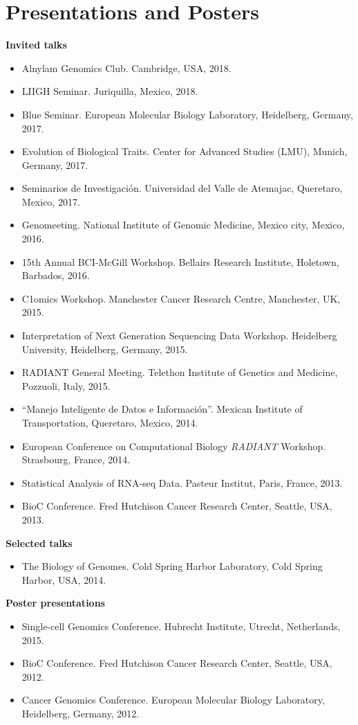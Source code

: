 \documentclass[11pt,a4paper,sans]{moderncv} %
\begin{document}
\section{Presentations and Posters}
\vspace{-.1cm}
\textbf{Invited talks}
\begin{itemize}
\item Alnylam Genomics Club. Cambridge, USA, 2018.
\item LIIGH Seminar. Juriquilla, Mexico, 2018.
\item Blue Seminar. European Molecular Biology Laboratory, Heidelberg, Germany, 2017. 
\item Evolution of Biological Traits. Center for Advanced Studies (LMU), Munich, Germany, 2017.
\item Seminarios de Investigaci\'on. Universidad del Valle de Atemajac, Queretaro, Mexico, 2017.
\item Genomeeting. National Institute of Genomic Medicine, Mexico city, Mexico, 2016. 
\item 15th Annual BCI-McGill Workshop. Bellairs Research Institute, Holetown, Barbados, 2016.
\item C1omics Workshop. Manchester Cancer Research Centre, Manchester, UK, 2015.
\item Interpretation of Next Generation Sequencing Data Workshop. Heidelberg University, Heidelberg, Germany, 2015. 
\item RADIANT General Meeting. Telethon Institute of Genetics and Medicine, Pozzuoli, Italy, 2015.
\item ``Manejo Inteligente de Datos e Informaci\'on''. Mexican Institute of Transportation, Queretaro, Mexico, 2014.
\item European Conference on Computational Biology \emph{RADIANT} Workshop. Strasbourg, France, 2014.
\item Statistical Analysis of RNA-seq Data. Pasteur Institut, Paris, France, 2013.
\item BioC Conference. Fred Hutchison Cancer Research Center, Seattle, USA, 2013.
\end{itemize}
\vspace{.1cm}
\textbf{Selected talks}
\begin{itemize}
\item The Biology of Genomes. Cold Spring Harbor Laboratory, Cold Spring Harbor, USA, 2014. 
\end{itemize}
\vspace{.1cm}
\textbf{Poster presentations}
\begin{itemize}
\item Single-cell Genomics Conference. Hubrecht Institute, Utrecht, Netherlands, 2015.
\item BioC Conference. Fred Hutchison Cancer Research Center, Seattle, USA, 2012.
\item Cancer Genomics Conference. European Molecular Biology Laboratory, Heidelberg, Germany, 2012.
\end{itemize}
\end{document}

